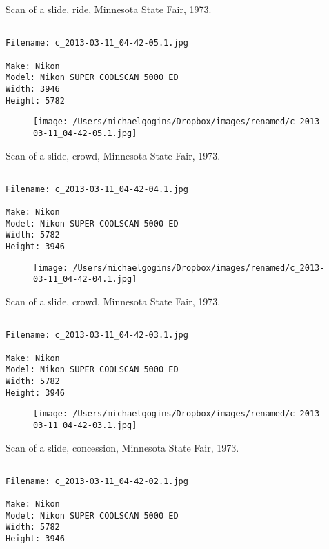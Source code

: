 \clearpage
\onecolumn
\noindent Scan of a slide, ride, Minnesota State Fair, 1973.
\noindent
\begin{lstlisting}

Filename: c_2013-03-11_04-42-05.1.jpg

Make: Nikon
Model: Nikon SUPER COOLSCAN 5000 ED
Width: 3946
Height: 5782
\end{lstlisting}
\clearpage

\begin{figure}
\texttt{[image: /Users/michaelgogins/Dropbox/images/renamed/c\_2013-03-11\_04-42-05.1.jpg]}
\end{figure}
    
\clearpage
\onecolumn
\noindent Scan of a slide, crowd, Minnesota State Fair, 1973.
\noindent
\begin{lstlisting}

Filename: c_2013-03-11_04-42-04.1.jpg

Make: Nikon
Model: Nikon SUPER COOLSCAN 5000 ED
Width: 5782
Height: 3946
\end{lstlisting}
\clearpage

\begin{figure}
\texttt{[image: /Users/michaelgogins/Dropbox/images/renamed/c\_2013-03-11\_04-42-04.1.jpg]}
\end{figure}
    
\clearpage
\onecolumn
\noindent Scan of a slide, crowd, Minnesota State Fair, 1973.
\noindent
\begin{lstlisting}

Filename: c_2013-03-11_04-42-03.1.jpg

Make: Nikon
Model: Nikon SUPER COOLSCAN 5000 ED
Width: 5782
Height: 3946
\end{lstlisting}
\clearpage

\begin{figure}
\texttt{[image: /Users/michaelgogins/Dropbox/images/renamed/c\_2013-03-11\_04-42-03.1.jpg]}
\end{figure}
    
\clearpage
\onecolumn
\noindent Scan of a slide, concession, Minnesota State Fair, 1973.
\noindent
\begin{lstlisting}

Filename: c_2013-03-11_04-42-02.1.jpg

Make: Nikon
Model: Nikon SUPER COOLSCAN 5000 ED
Width: 5782
Height: 3946
\end{lstlisting}
\clearpage

